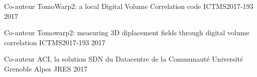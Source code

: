 

\begin{cventries}

  \cventrynodescr
    {Co-auteur} %
    {TomoWarp2: a local Digital Volume Correlation code} %
    {ICTMS2017-193} %
    {2017} %

  \cventrynodescr
    {Co-auteur} %
    {Tomowarp2: measuring 3D diplacement fields through digital volume correlation} %
    {ICTMS2017-193} %
    {2017} %

  \cventrynodescr
    {Co-auteur} %
    {ACI, la solution SDN du Datacentre de la Communauté Université Grenoble Alpes} %
    {JRES} %
    {2017} %

\end{cventries}
